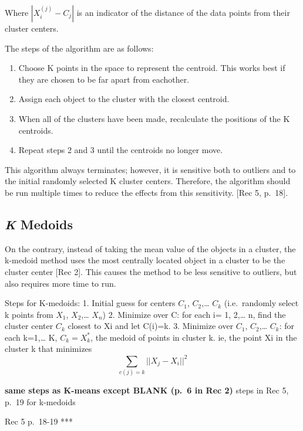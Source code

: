 \documentclass[12pt,twoside]{amherstthesis}
\providecommand{\tightlist}{%
  \setlength{\itemsep}{0pt}\setlength{\parskip}{0pt}}
\begin{document}
  Where \(|{{X_i^{(j)}- C_j}}|\) is an indicator of the distance of the
  data points from their cluster centers.
  
  The steps of the algorithm are as follows:
  
  \begin{enumerate}
  \def\labelenumi{\arabic{enumi}.}
  \tightlist
  \item
    Choose K points in the space to represent the centroid. This works
    best if they are chosen to be far apart from eachother.
  \item
    Assign each object to the cluster with the closest centroid.
  \item
    When all of the clusters have been made, recalculate the positions of
    the K centroids.
  \item
    Repeat steps 2 and 3 until the centroids no longer move.
  \end{enumerate}
  
  This algorithm always terminates; however, it is sensitive both to
  outliers and to the initial randomly selected K cluster centers.
  Therefore, the algorithm should be run multiple times to reduce the
  effects from this sensitivity. {[}Rec 5, p.~18{]}.
  
  \subsection{\texorpdfstring{\emph{K}
  Medoids}{K Medoids}}\label{k-medoids}
  
  On the contrary, instead of taking the mean value of the objects in a
  cluster, the k-medoid method uses the most centrally located object in a
  cluster to be the cluster center {[}Rec 2{]}. This causes the method to
  be less sensitive to outliers, but also requires more time to run.
  
  Steps for K-medoids: 1. Initial guess for centers \(C_1\),
  \(C_2\),\ldots{} \(C_k\) (i.e.~randomly select k points from \(X_1\),
  \(X_2\),\ldots{} \(X_n\)) 2. Minimize over C: for each i= 1, 2,\ldots{}
  n, find the cluster center \(C_k\) closest to Xi and let C(i)=k. 3.
  Minimize over \(C_1\), \(C_2\),\ldots{} \(C_k\): for each k=1,\ldots{}
  K, \(C_k = X_k^*\), the medoid of points in cluster k. ie, the point Xi
  in the cluster k that minimizes \[\sum _{c(j)=k} ||{{X_j- X_i}}||^2\]
  
  \textbf{same steps as K-means except BLANK (p.~6 in Rec 2) }steps in Rec
  5, p.~19 for k-medoids
  
  Rec 5 p.~18-19 ***
  
\end{document}
